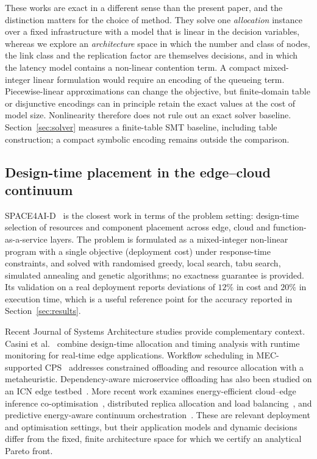 These works are exact in a different sense than the present paper, and the distinction
matters for the choice of method. They solve one \emph{allocation} instance over a fixed
infrastructure with a model that is linear in the decision variables, whereas we explore
an \emph{architecture} space in which the number and class of nodes, the link class and
the replication factor are themselves decisions, and in which the latency model contains
a non-linear contention term. A compact mixed-integer linear formulation would require an encoding of the
queueing term. Piecewise-linear approximations can change the objective, but
finite-domain table or disjunctive encodings can in principle retain the exact
values at the cost of model size. Nonlinearity therefore does not rule out an
exact solver baseline. Section~\ref{sec:solver} measures a finite-table SMT baseline, including table construction; a compact symbolic encoding remains outside the comparison.

\subsection{Design-time placement in the edge--cloud continuum}
SPACE4AI-D~\cite{sedghani2024space4aid} is the closest work in terms of the problem
setting: design-time selection of resources and component placement across edge, cloud
and function-as-a-service layers. The problem is formulated as a mixed-integer
non-linear program with a single objective (deployment cost) under response-time
constraints, and solved with randomised greedy, local search, tabu search, simulated
annealing and genetic algorithms; no exactness guarantee is provided. Its validation on
a real deployment reports deviations of $12\%$ in cost and $20\%$ in execution time,
which is a useful reference point for the accuracy reported in
Section~\ref{sec:results}.

Recent Journal of Systems Architecture studies provide complementary context.
Casini et al.~\cite{casini2025edge} combine design-time allocation and timing analysis
with runtime monitoring for real-time edge applications. Workflow scheduling in
MEC-supported CPS~\cite{gene2024} addresses constrained offloading and resource allocation
with a metaheuristic. Dependency-aware microservice offloading has also been studied
on an ICN edge testbed~\cite{ali2026icn}. More recent work examines energy-efficient
cloud--edge inference co-optimisation~\cite{cloud2026coopt}, distributed replica allocation
and load balancing~\cite{filippini2026replica}, and predictive energy-aware continuum
orchestration~\cite{predictive2026}. These are relevant deployment and optimisation
settings, but their application models and dynamic decisions differ from the fixed,
finite architecture space for which we certify an analytical Pareto front.

